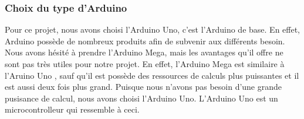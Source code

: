 \documentclass[a4paper,12pt]{report}
\begin{document}
{\subsubsection{Choix du type d'Arduino}
Pour ce projet, nous avons choisi l'Arduino Uno, c'est l'Arduino de base. En effet, Arduino possède de nombreux produits afin de subvenir aux différents besoin. Nous avons hésité à prendre l'Arduino Mega, mais les avantages qu'il offre ne sont pas très utiles pour notre projet. En effet, l'Arduino Mega est similaire à l'Aruino Uno , sauf qu'il est possède des ressources de calculs plus puissantes et il est aussi deux fois plus grand. Puisque nous n'avons pas besoin d'une grande pusisance de calcul, nous avons choisi l'Arduino Uno. L'Arduino Uno est un microcontrolleur qui ressemble à ceci.\\

}
\end{document}
